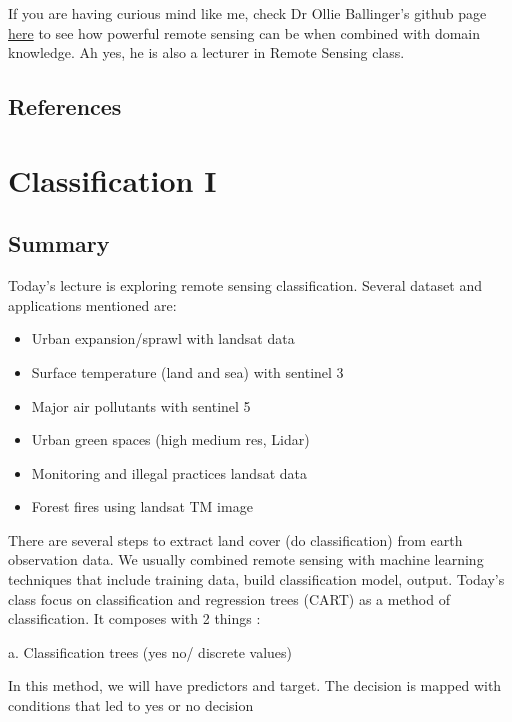 \documentclass[
  letterpaper,
  DIV=11,
  numbers=noendperiod]{scrreprt}
\begin{document}
If you are having curious mind like me, check Dr Ollie Ballinger's
github page \href{https://oballinger.github.io/\#}{here} to see how
powerful remote sensing can be when combined with domain knowledge. Ah
yes, he is also a lecturer in Remote Sensing class.

\hypertarget{references-2}{%
\section{References}\label{references-2}}


\hypertarget{classification-i}{%
\chapter{Classification I}\label{classification-i}}

\hypertarget{summary-5}{%
\section{Summary}\label{summary-5}}

Today's lecture is exploring remote sensing classification. Several
dataset and applications mentioned are:

\begin{itemize}
\item
  Urban expansion/sprawl with landsat data
\item
  Surface temperature (land and sea) with sentinel 3
\item
  Major air pollutants with sentinel 5
\item
  Urban green spaces (high medium res, Lidar)
\item
  Monitoring and illegal practices landsat data
\item
  Forest fires using landsat TM image
\end{itemize}

There are several steps to extract land cover (do classification) from
earth observation data. We usually combined remote sensing with machine
learning techniques that include training data, build classification
model, output. Today's class focus on classification and regression
trees (CART) as a method of classification. It composes with 2 things :

a. Classification trees (yes no/ discrete values)

In this method, we will have predictors and target. The decision is
mapped with conditions that led to yes or no decision
\end{document}

